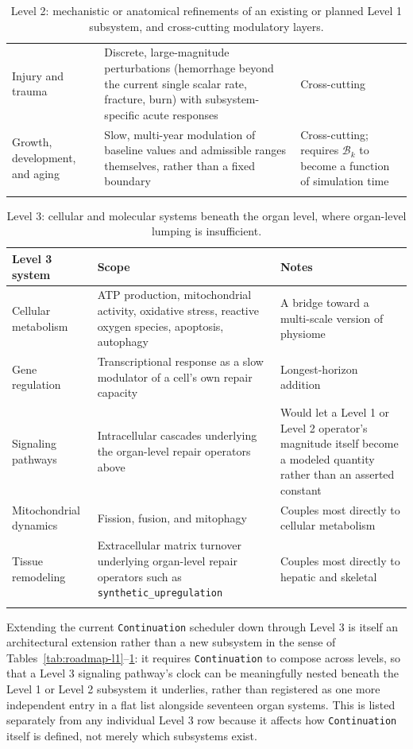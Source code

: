 \documentclass[11pt]{article}
\begin{document}
\begin{longtable}{@{}p{2.6cm}p{7.3cm}p{2.8cm}@{}}
Injury and trauma & Discrete, large-magnitude perturbations (hemorrhage beyond the current single scalar rate, fracture, burn) with subsystem-specific acute responses & Cross-cutting \\
Growth, development, and aging & Slow, multi-year modulation of baseline values and admissible ranges themselves, rather than a fixed boundary & Cross-cutting; requires $\mathcal B_k$ to become a function of simulation time \\
\bottomrule
\caption{Level 2: mechanistic or anatomical refinements of an existing or planned Level 1 subsystem, and cross-cutting modulatory layers.}
\label{tab:roadmap-l2}
\end{longtable}

\begin{longtable}{@{}p{2.6cm}p{7.3cm}p{2.8cm}@{}}
\toprule
Level 3 system & Scope & Notes \\
\midrule
\endhead
Cellular metabolism & ATP production, mitochondrial activity, oxidative stress, reactive oxygen species, apoptosis, autophagy & A bridge toward a multi-scale version of physiome \\
Gene regulation & Transcriptional response as a slow modulator of a cell's own repair capacity & Longest-horizon addition \\
Signaling pathways & Intracellular cascades underlying the organ-level repair operators above & Would let a Level 1 or Level 2 operator's magnitude itself become a modeled quantity rather than an asserted constant \\
Mitochondrial dynamics & Fission, fusion, and mitophagy & Couples most directly to cellular metabolism \\
Tissue remodeling & Extracellular matrix turnover underlying organ-level repair operators such as \texttt{synthetic\_upregulation} & Couples most directly to hepatic and skeletal \\
\bottomrule
\caption{Level 3: cellular and molecular systems beneath the organ level, where organ-level lumping is insufficient.}
\label{tab:roadmap-l3}
\end{longtable}

Extending the current \texttt{Continuation} scheduler down through Level 3 is itself an architectural extension rather than a new subsystem in the sense of Tables~\ref{tab:roadmap-l1}--\ref{tab:roadmap-l2}: it requires \texttt{Continuation} to compose across levels, so that a Level 3 signaling pathway's clock can be meaningfully nested beneath the Level 1 or Level 2 subsystem it underlies, rather than registered as one more independent entry in a flat list alongside seventeen organ systems. This is listed separately from any individual Level 3 row because it affects how \texttt{Continuation} itself is defined, not merely which subsystems exist.
\end{document}
